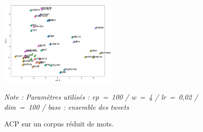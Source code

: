 \documentclass[11pt,french,french]{article}
\begin{document}
\begin{figure}[!h]
\begin{center}
\includegraphics[width=0.5\textwidth]{img/acp_gensim.png}
\captionsetup{margin=0cm,format=hang,justification=justified}
\caption{ACP sur un corpus réduit de mots.}\label{fig:acp_gensim}
\end{center}
\vspace{-0.3cm}
\footnotesize
\emph{Note : Paramètres utilisés : ep = 100 / w = 4 / lr = 0,02 / dim = 100 / base : ensemble des tweets }
\end{figure}
\end{document}
